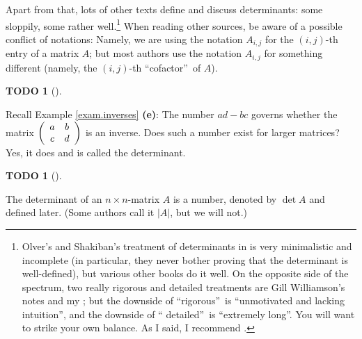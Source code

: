 \documentclass[numbers=enddot,12pt,final,onecolumn,notitlepage]{scrartcl}%
\theoremstyle{definition}
\newtheorem{quest}[theo]{TODO}
\newenvironment{todo}[1][]
{\begin{quest}[#1]\begin{leftbar}}
{\end{leftbar}\end{quest}}
\begin{document}
Apart from that, lots of other texts define and discuss determinants: some
sloppily, some rather well.\footnote{Olver's and Shakiban's treatment of
determinants in \cite[\S 1.9]{OlvSha06} is very minimalistic and incomplete
(in particular, they never bother proving that the determinant is
well-defined), but various other books do it well. On the opposite side of the
spectrum, two really rigorous and detailed treatments are Gill Williamson's
notes \cite[Chapter 3]{Gill} and my \cite{detnotes}; but the downside of
\textquotedblleft rigorous\textquotedblright\ is \textquotedblleft unmotivated
and lacking intuition\textquotedblright, and the downside of \textquotedblleft
detailed\textquotedblright\ is \textquotedblleft extremely
long\textquotedblright. You will want to strike your own balance. As I said, I
recommend \cite[Chapter 8]{LaNaSc16}.} When reading other sources, be aware of
a possible conflict of notations: Namely, we are using the notation $A_{i,j}$
for the $\left(  i,j\right)  $-th entry of a matrix $A$; but most authors use
the notation $A_{i,j}$ for something different (namely, the $\left(
i,j\right)  $-th \textquotedblleft cofactor\textquotedblright\ of $A$).

\begin{todo}
Recall Example \ref{exam.inverses} \textbf{(e)}: The number $ad-bc$ governs
whether the matrix $\left(
\begin{array}
[c]{cc}%
a & b\\
c & d
\end{array}
\right)  $ is an inverse. Does such a number exist for larger matrices? Yes,
it does and is called the determinant.
\end{todo}

\begin{todo}
The determinant of an $n\times n$-matrix $A$ is a number, denoted by $\det A$
and defined later. (Some authors call it $\left\vert A\right\vert $, but we
will not.)
\end{todo}
\end{document}

